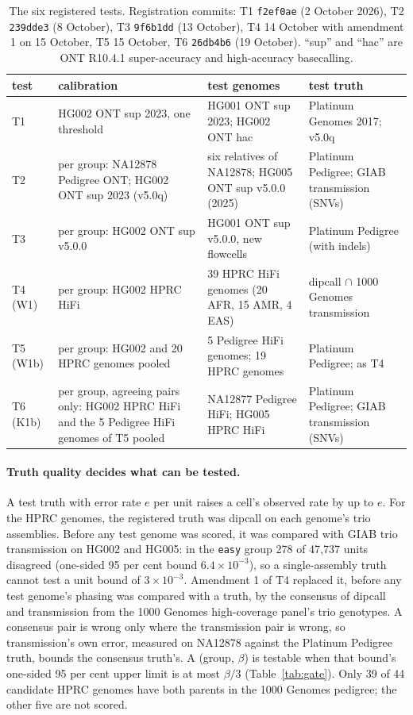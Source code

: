\documentclass[11pt]{article}
\theoremstyle{definition}
\theoremstyle{remark}
\begin{document}
\begin{table}[t]
\centering\footnotesize
\begin{tabular}{@{}p{1.2cm}p{4.0cm}p{5.1cm}p{3.6cm}@{}}
\toprule
test & calibration & test genomes & test truth\\
\midrule
T1 & HG002 ONT sup 2023, one threshold & HG001 ONT sup 2023; HG002 ONT hac & Platinum Genomes 2017; v5.0q\\
T2 & per group: NA12878 Pedigree ONT; HG002 ONT sup 2023 (v5.0q) & six relatives of NA12878; HG005 ONT sup v5.0.0 (2025) & Platinum Pedigree; GIAB transmission (SNVs)\\
T3 & per group: HG002 ONT sup v5.0.0 & HG001 ONT sup v5.0.0, new flowcells & Platinum Pedigree (with indels)\\
T4 (W1) & per group: HG002 HPRC HiFi & 39 HPRC HiFi genomes (20 AFR, 15 AMR, 4 EAS) & dipcall $\cap$ 1000 Genomes transmission\\
T5 (W1b) & per group: HG002 and 20 HPRC genomes pooled & 5 Pedigree HiFi genomes; 19 HPRC genomes & Platinum Pedigree; as T4\\
T6 (K1b) & per group, agreeing pairs only: HG002 HPRC HiFi and the 5 Pedigree HiFi genomes of T5 pooled & NA12877 Pedigree HiFi; HG005 HPRC HiFi & Platinum Pedigree; GIAB transmission (SNVs)\\
\bottomrule
\end{tabular}
\caption{The six registered tests. Registration commits: T1 \texttt{f2ef0ae}
(2 October 2026), T2 \texttt{239dde3} (8 October), T3 \texttt{9f6b1dd} (13
October), T4 14 October with amendment 1 on 15 October, T5 15 October, T6
\texttt{26db4b6} (19 October).
``sup'' and ``hac'' are ONT R10.4.1 super-accuracy and high-accuracy
basecalling.}
\label{tab:design}
\end{table}

\paragraph{Truth quality decides what can be tested.} A test truth with
error rate $e$ per unit raises a cell's observed rate by up to $e$. For the
HPRC genomes, the registered truth was dipcall on each genome's trio
assemblies. Before any test genome was scored, it was compared with GIAB
trio transmission on HG002 and HG005: in the \texttt{easy} group 278 of
47{,}737 units disagreed (one-sided 95 per cent bound $6.4\times10^{-3}$), so
a single-assembly truth cannot test a unit bound of $3\times10^{-3}$.
Amendment 1 of T4 replaced it, before any test genome's phasing was
compared with a truth, by the consensus of dipcall and transmission from
the 1000 Genomes high-coverage panel's trio genotypes. A consensus pair is
wrong only where the transmission pair is wrong, so transmission's own
error, measured on NA12878 against the Platinum Pedigree truth, bounds the
consensus truth's. A (group, $\beta$) is testable when that bound's one-sided
95 per cent upper limit is at most $\beta/3$ (Table~\ref{tab:gate}). Only
39 of 44 candidate HPRC genomes have both parents in the 1000 Genomes
pedigree; the other five are not scored.
\end{document}
